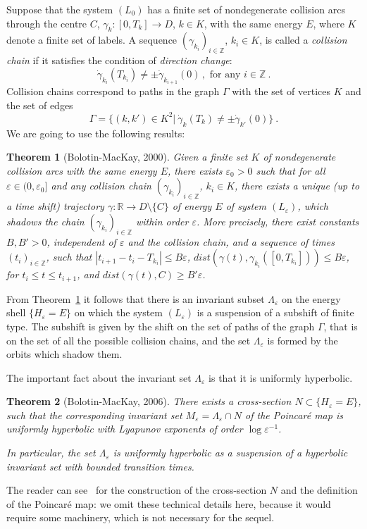 \documentclass[a4paper]{article}
\newtheorem{theorem}{Theorem}
\begin{document}
Suppose that the system $(L_0)$ has a finite set of nondegenerate
collision arcs through the centre $C$, $\gamma_k: [0,T_k] \rightarrow
D$, $k \in K$, with the same energy $E$, where $K$ denote a finite set
of labels.  A sequence $(\gamma_{k_i})_{i \in {\mathbb{Z}}}$, $k_i \in K$, is
called a \emph{collision chain} if it satisfies the condition of
\emph{direction change}:
\[
\dot{\gamma}_{k_i}(T_{k_i}) \neq \pm \dot{\gamma}_{k_{i+1}}(0)\,, 
\textrm{ for any } i \in {\mathbb{Z}} \ .
\]
Collision chains correspond to paths in the graph $\Gamma$ with the
set of vertices $K$ and the set of edges
\begin{equation}
\label{graph}
\Gamma=\{(k,k') \in K^2| \ 
\dot{\gamma}_{k}(T_{k}) \neq \pm \dot{\gamma}_{k'}(0)\}\ .
\end{equation}
We are going to use the following results:
\begin{theorem}[Bolotin-MacKay, 2000]
\label{bol-mack}
Given a finite set $K$ of nondegenerate collision arcs with the same
energy $E$, there exists $\varepsilon_0>0$ such that for all
$\varepsilon \in (0,\varepsilon_0]$ and any collision chain
  $(\gamma_{k_i})_{i \in {\mathbb{Z}}}$, $k_i \in K$, there exists a unique (up
  to a time shift) trajectory $\gamma: {\mathbb{R}} \rightarrow D\setminus
  \{C\}$ of energy $E$ of system $(L_{\varepsilon})$, which shadows
  the chain $(\gamma_{k_i})_{i \in {\mathbb{Z}}}$ within order $\varepsilon$.
  More precisely, there exist constants $B, B' > 0$, independent of
  $\varepsilon$ and the collision chain, and a sequence of times
  $(t_i)_{i\in {\mathbb{Z}}}$, such that $|t_{i+1}-t_i-T_{k_i}|\le
  B\varepsilon$, $dist(\gamma(t),\gamma_{k_i}([0, T_{k_i}])) \le
  B\varepsilon$, for $t_i\le t \le t_{i+1}$, and $dist(\gamma(t),C)\ge
  B'\varepsilon$.
\end{theorem}
From Theorem~\ref{bol-mack} it follows that there is an invariant
subset $\Lambda_{\varepsilon}$ on the energy shell
$\{H_{\varepsilon}=E\}$ on which the system $(L_{\varepsilon})$ is a
suspension of a subshift of finite type.  The subshift is given by the
shift on the set of paths of the graph $\Gamma$, that is on the set of
all the possible collision chains, and the set $\Lambda_{\varepsilon}$
is formed by the orbits which shadow them.

The important fact about the invariant set $\Lambda_{\varepsilon}$ is
that it is uniformly hyperbolic.

\begin{theorem}[Bolotin-MacKay, 2006]
  \label{bol-mack_hyperb}
There exists a cross-section $N \subset \{H_{\varepsilon} = E\}$, such
that the corresponding invariant set
$M_{\varepsilon}=\Lambda_{\varepsilon}\cap N$ of the Poincar\'e map is
uniformly hyperbolic with Lyapunov exponents of order $\log
\varepsilon^{-1}$.
  
In particular, the set $\Lambda_{\varepsilon}$ is uniformly hyperbolic
as a suspension of a hyperbolic invariant set with bounded transition
times.
\end{theorem}
The reader can see~\cite{BM2} for the construction of the
cross-section $N$ and the definition of the Poincar\'e map: we omit
these technical details here, because it would require some machinery,
which is not necessary for the sequel.
  
\end{document}
